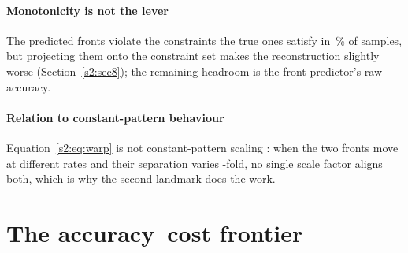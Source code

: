 \paragraph{Monotonicity is not the lever} The predicted fronts violate the
constraints the true ones satisfy in \nWarpNonmonoLo\,\% of samples, but projecting
them onto the constraint set makes the reconstruction slightly worse
(Section~\ref{s2:sec8}); the remaining headroom is the front predictor's raw
accuracy.

\paragraph{Relation to constant-pattern behaviour} Equation~\eqref{s2:eq:warp} is not
constant-pattern scaling \cite{knox2016limitations}: when the two fronts move at
different rates and their separation varies \nGapRange-fold, no single scale factor
aligns both, which is why the second landmark does the work.


\section{The accuracy--cost frontier}

\begin{table}[t]
\centering
\caption{The accuracy--cost frontier, in solve-equivalents. Each row is a point on
the learning curve of Section~\ref{sec:ladder}, priced; its error is that of the curve's
per-mode gradient-boosting learner. The last column is a \emph{lower} bound on the number of
screening queries at which a surrogate becomes cheaper than the production solve; it needs
only the data cost, so it holds for any learner and whatever a query costs. The main text
(Section~\ref{sec:cost}) prices DeepONet's fit and compares against the coarse solve, which
moves the break-even point to about \nCostBeFit\ queries.}
\label{s2:tab:cost}
\end{table}

